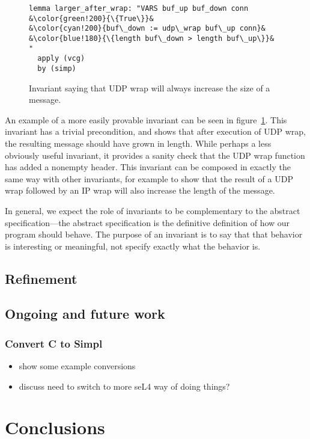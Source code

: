 \documentclass[twoside]{memoir}
\begin{document}
\begin{figure}
    \centering
\begin{lstlisting}[language=isabelle]
lemma larger_after_wrap: "VARS buf_up buf_down conn
&\color{green!200}{\{True\}}&
&\color{cyan!200}{buf\_down := udp\_wrap buf\_up conn}&
&\color{blue!180}{\{length buf\_down > length buf\_up\}}&
"
  apply (vcg)
  by (simp)
\end{lstlisting}
    \caption{Invariant saying that UDP wrap will always increase the size
        of a message.}
    \label{fig:inv-wrap-inc}
\end{figure}

An example of a more easily provable invariant can be seen in figure~\ref{fig:inv-wrap-inc}. This invariant has a trivial precondition,
and shows that after execution of UDP wrap, the resulting
message should have grown in length.
While perhaps a less obviously useful invariant,
it provides a sanity check that the UDP wrap function
has added a nonempty header.
This invariant can be composed in exactly the same way with other
invariants, for example to show that the result of a UDP wrap followed
by an IP wrap will also increase the length of the message.

In general, we expect the role of invariants to be complementary to the
abstract specification---the abstract specification is the definitive
definition of how our program should behave.
The purpose of an invariant is to say that that behavior is interesting
or meaningful, not specify exactly what the behavior is.


\section{Refinement}

\section{Ongoing and future work}
\subsection{Convert C to Simpl}
\begin{itemize}
    \item show some example conversions
    \item discuss need to switch to more seL4 way of doing things?
\end{itemize}

\chapter{Conclusions}
\end{document}
